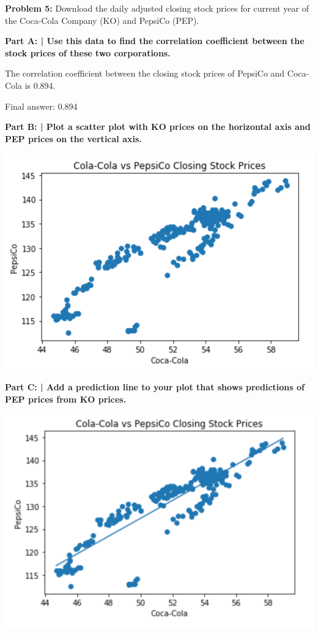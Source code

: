 \documentclass{article}
\begin{document}
 \newpage
 
 \begin{center}
     \Large\textbf{Problem 5:} Download the daily adjusted closing stock prices for current year of the Coca-Cola Company (KO) and PepsiCo (PEP).\par
 \end{center}
 
 \textbf{Part A: | Use this data to find the correlation coefficient between  the stock prices of these two corporations.}\newline\newline
 
 The correlation coefficient between the closing stock prices of PepsiCo and Coca-Cola is 0.894.\newline
 
 Final answer: 0.894\newline
 
 \textbf{Part B: | Plot a scatter plot with KO prices on the horizontal axis and PEP prices on the vertical axis.}\newline\newline
 
 \includegraphics{HW2_5.PNG}
 
 \textbf{Part C: | Add a prediction line to your plot that shows predictions of PEP prices from KO prices.}\newline\newline
 
 \includegraphics{HW2_6.PNG}
 
\end{document}
